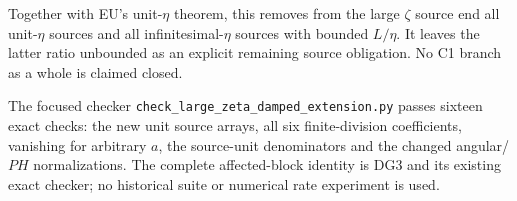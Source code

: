 Together with EU's unit-$\eta$ theorem, this removes from the large
$\zeta$ source end all unit-$\eta$ sources and all infinitesimal-$\eta$
sources with bounded $L/\eta$. It leaves the latter ratio unbounded
as an explicit remaining source obligation. No C1 branch as a whole
is claimed closed.

The focused checker
\texttt{check\_large\_zeta\_damped\_extension.py} passes sixteen
exact checks: the new unit source arrays, all six finite-division
coefficients, vanishing for arbitrary $a$, the source-unit
denominators and the changed angular/$PH$ normalizations. The
complete affected-block identity is DG3 and its existing exact
checker; no historical suite or numerical rate experiment is used.

